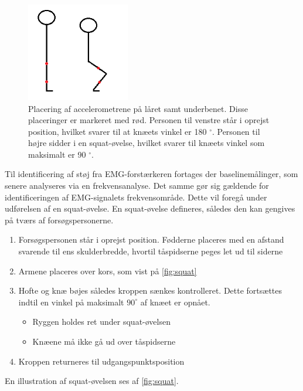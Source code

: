\begin{figure}[H]
\centering
\includegraphics[width=0.4\textwidth]{figures/accelerometervinkel.png}
\caption{Placering af accelerometrene på låret samt underbenet. Disse placeringer er markeret med rød. Personen til venstre står i oprejst position, hvilket svarer til at knæets vinkel er 180 $^{\circ}$. Personen til højre sidder i en squat-øvelse, hvilket svarer til knæets vinkel som maksimalt er 90 $^{\circ}$.}
\label{fig:accelerometervinkel}
\end{figure}

Til identificering af støj fra EMG-forstærkeren fortages der baselinemålinger, som senere analyseres via en frekvensanalyse. Det samme gør sig gældende for identificeringen af EMG-signalets frekvensområde. Dette vil foregå under udførelsen af en squat-øvelse.
En squat-øvelse defineres, således den kan gengives på tværs af forsøgspersonerne.\vspace{3mm}
\begin{enumerate}
\item Forsøgspersonen står i oprejst position. Fødderne placeres med en afstand svarende til ens skulderbredde, hvortil tåspidserne peges let ud til siderne
\item Armene placeres over kors, som vist på \autoref{fig:squat}
\item Hofte og knæ bøjes således kroppen sænkes kontrolleret. Dette fortsættes indtil en vinkel på maksimalt $90^{\circ}$ af knæet er opnået.
	\begin{itemize}
	\item Ryggen holdes ret under squat-øvelsen 
	\item Knæene må ikke gå ud over tåspidserne 
	\end{itemize}
\item Kroppen returneres til udgangspunktsposition
\end{enumerate} \vspace{3mm}
En illustration af squat-øvelsen ses af \autoref{fig:squat}.

